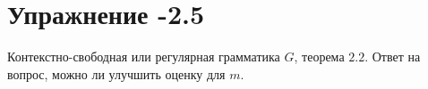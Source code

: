\documentclass[12pt, a4paper, oneside]{memoir}
\begin{document}
\section*{Упражнение -2.5}
\begin{solution}
    {Контекстно-свободная или регулярная грамматика $G$, теорема $2.2$.}
    {Ответ  на вопрос, можно ли улучшить оценку для $m$.}
    {}

\end{solution}
\end{document}
